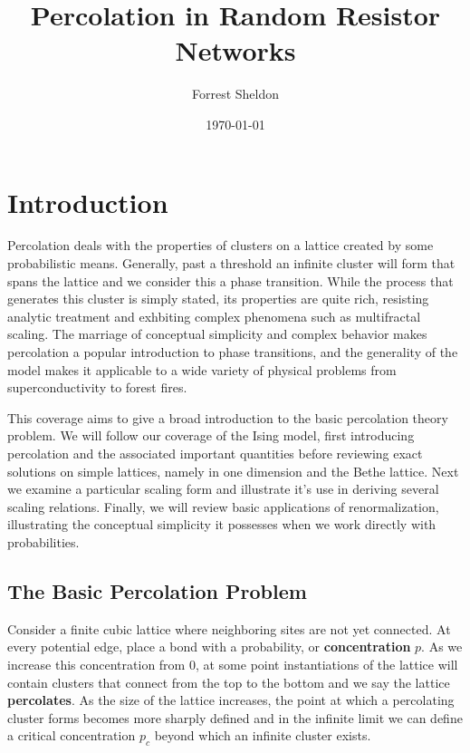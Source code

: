 
\usepackage{graphicx}

\title{Percolation in Random Resistor Networks}
\author{Forrest Sheldon}
\date{\today}

\maketitle

\section{Introduction}

Percolation deals with the properties of clusters on a lattice created by some
probabilistic means. Generally, past a threshold an infinite cluster
will form that spans the lattice and we consider this a phase transition.
While the process that generates this cluster is simply stated, its properties
are quite rich, resisting analytic treatment and exhbiting complex phenomena
such as multifractal scaling. The marriage of conceptual simplicity and
complex behavior makes percolation a popular introduction to phase transitions,
and the generality of the model makes it applicable to a wide variety of physical
problems from superconductivity to forest fires.


This coverage aims to give a broad introduction to the basic percolation theory
problem.
We will follow our coverage of the Ising model, first introducing percolation and
the associated important quantities before
reviewing exact solutions on simple lattices, namely in one dimension and the Bethe
lattice.  Next we examine a particular scaling form and illustrate it's use in
deriving several scaling relations.  Finally, we will review basic applications of
renormalization, illustrating the conceptual simplicity it possesses when we work
directly with probabilities.

\subsection{The Basic Percolation Problem}

Consider a finite cubic lattice where neighboring sites are not yet connected.
At every potential edge, place a bond with a probability, or \textbf{concentration}
$p$. As we increase this concentration from 0, at some point instantiations of the
lattice will contain clusters that connect from the top to the bottom and we say
the lattice \textbf{percolates}.  As the size of the lattice
increases, the point at which a percolating cluster forms becomes more sharply
defined and in the infinite limit we can define a critical concentration
$p_c$ beyond which an infinite cluster exists.

